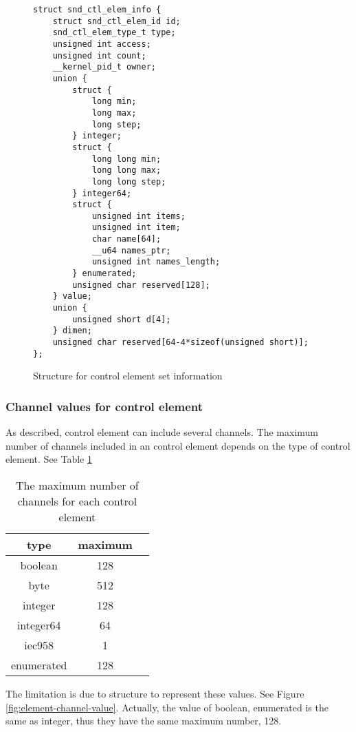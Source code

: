 \documentclass[onecolumn]{article}
\begin{document}
\begin{figure}[htbp]
\small
\begin{verbatim}
struct snd_ctl_elem_info {
    struct snd_ctl_elem_id id;
    snd_ctl_elem_type_t type;
    unsigned int access;
    unsigned int count;
    __kernel_pid_t owner;
    union {
        struct {
            long min;
            long max;
            long step;
        } integer;
        struct {
            long long min;
            long long max;
            long long step;
        } integer64;
        struct {
            unsigned int items;
            unsigned int item;
            char name[64];
            __u64 names_ptr;
            unsigned int names_length;
        } enumerated;
        unsigned char reserved[128];
    } value;
    union {
        unsigned short d[4];
    } dimen;
    unsigned char reserved[64-4*sizeof(unsigned short)];
};
\end{verbatim}
\caption{{Structure for control element set information}}
\label{fig:element-set-info-structure}
\end{figure}

\subsubsection{Channel values for control element}

As described, control element can include several channels. The maximum number of channels included in an control element depends on the type of control element. See Table \ref{tbl:max-channels}

\begin{table}[H]
        \centering
        \caption{{The maximum number of channels for each control element}}
        \label{tbl:max-channels}
        \begin{tabular}{ccc} \toprule
		type & maximum \\ \midrule
		boolean & 128 \\
		byte & 512 \\
		integer & 128 \\
		integer64 & 64 \\
		iec958 & 1 \\
		enumerated & 128 \\ \bottomrule
        \end{tabular}
\end{table}

The limitation is due to structure to represent these values. See Figure \ref{fig:element-channel-value}. Actually, the value of boolean, enumerated is the same as integer, thus they have the same maximum number, 128.
\end{document}
